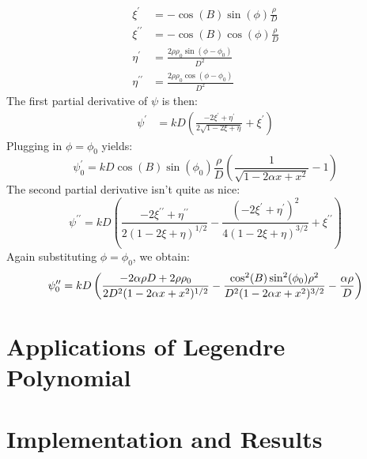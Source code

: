 \documentclass{article}
\begin{document}
        \begin{align}
            \xi^{\prime}
            &=-\cos(B)\sin(\phi)\frac{\rho}{D}\\
            \xi^{\prime\prime}
            &=-\cos(B)\cos(\phi)\frac{\rho}{D}\\
            \eta^{\prime}
            &=\frac{2\rho\rho_{0}\sin(\phi-\phi_{0})}{D^{2}}\\
            \eta^{\prime\prime}
            &=\frac{2\rho\rho_{0}\cos(\phi-\phi_{0})}{D^{2}}
        \end{align}
        The first partial derivative of $\psi$ is then:
        \begin{align}
            \psi^{\prime}
            &=kD\left(
                \frac{-2\xi^{\prime}+\eta^{\prime}}{2\sqrt{1-2\xi+\eta}}
                +\xi^{\prime}
            \right)
        \end{align}
        Plugging in $\phi=\phi_{0}$ yields:
        \begin{equation}
            \psi^{\prime}_{0}
            =kD\cos(B)\sin(\phi_{0})\frac{\rho}{D}\left(
                \frac{1}{\sqrt{1-2\alpha{x}+x^{2}}}-1
            \right)
        \end{equation}
        The second partial derivative isn't quite as nice:
        \begin{equation}
            \psi^{\prime\prime}
            =kD\left(
                    \frac{-2\xi^{\prime\prime}+\eta^{\prime\prime}}
                          {2(1-2\xi+\eta)^{1/2}}-
                    \frac{(-2\xi^{\prime}+\eta^{\prime})^{2}}
                         {4(1-2\xi+\eta)^{3/2}}+
                    \xi^{\prime\prime}
            \right)
        \end{equation}
        Again substituting $\phi=\phi_{0}$, we obtain:
        \begin{equation}
            \psi^{\prime\prime}_{0}
            =kD\left(
                \frac{%
                    -2\alpha\rho{D}+2\rho\rho_{0}
                }{%
                    2D^{2}(1-2\alpha{x}+x^{2})^{1/2}
                }
                -\frac{%
                    \cos^{2}(B)\sin^{2}(\phi_{0})\rho^{2}
                }{%
                    D^{2}(1-2\alpha{x}+x^{2})^{3/2}
                }
                -\frac{\alpha\rho}{D}
            \right)
        \end{equation}
    \section{Applications of Legendre Polynomial}
    \section{Implementation and Results}
\end{document}
